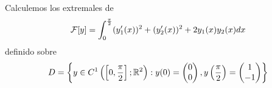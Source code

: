  \begin{ejemplo}
    Calculemos los extremales de 
    \begin{gather*}
        \mathcal{F}[y] = \int_0^{\frac{\pi}{2}} (y_1'(x))^2 + (y_2'(x))^2 + 2y_1(x)y_2(x) dx
    \end{gather*}
    definido sobre
    \begin{gather*}
        D = \left\{y\in C^1\left(\left[0,\frac{\pi}{2}\right];\mathbb{R}^2\right) : y(0) = 
        \begin{pmatrix}
            0\\ 0
        \end{pmatrix}
        , y\left(\frac{\pi}{2}\right) = 
        \begin{pmatrix}
            1 \\ -1
        \end{pmatrix}
        \right\}
    \end{gather*}
 \end{ejemplo}

